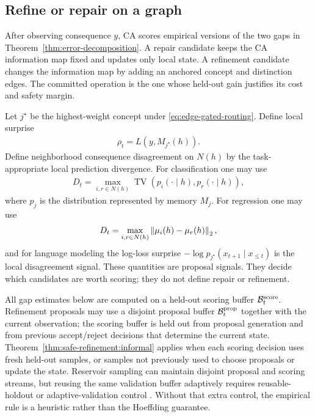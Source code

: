 \subsection{Refine or repair on a graph}

After observing consequence $y$, CA scores empirical versions of the two gaps in Theorem~\ref{thm:error-decomposition}. A repair candidate keeps the CA information map fixed and updates only local state. A refinement candidate changes the information map by adding an anchored concept and distinction edges. The committed operation is the one whose held-out gain justifies its cost and safety margin.

Let $j^\star$ be the highest-weight concept under \eqref{eq:edge-gated-routing}. Define local surprise
\begin{align*}
\rho_t=L(y,M_{j^\star}(h)).
\end{align*}
Define neighborhood consequence disagreement on $N(h)$ by the task-appropriate local prediction divergence. For classification one may use
\begin{align*}
D_t=\max_{i,r\in N(h)}\operatorname{TV}(p_i(\cdot\mid h),p_r(\cdot\mid h)),
\end{align*}
where $p_j$ is the distribution represented by memory $M_j$. For regression one may use
\begin{align*}
D_t=\max_{i,r\in N(h)}\left\lVert\mu_i(h)-\mu_r(h)\right\rVert_2,
\end{align*}
and for language modeling the log-loss surprise $-\log p_{j^\star}(x_{t+1}\mid x_{\le t})$ is the local disagreement signal. These quantities are proposal signals. They decide which candidates are worth scoring; they do not define repair or refinement.

All gap estimates below are computed on a held-out scoring buffer $\mathcal{B}_t^{\mathrm{score}}$. Refinement proposals may use a disjoint proposal buffer $\mathcal{B}_t^{\mathrm{prop}}$ together with the current observation; the scoring buffer is held out from proposal generation and from previous accept/reject decisions that determine the current state. Theorem~\ref{thm:safe-refinement:informal} applies when each scoring decision uses fresh held-out samples, or samples not previously used to choose proposals or update the state. Reservoir sampling can maintain disjoint proposal and scoring streams, but reusing the same validation buffer adaptively requires reusable-holdout or adaptive-validation control \citep{dwork2015reusable,dwork2015generalization}. Without that extra control, the empirical rule is a heuristic rather than the Hoeffding guarantee.

